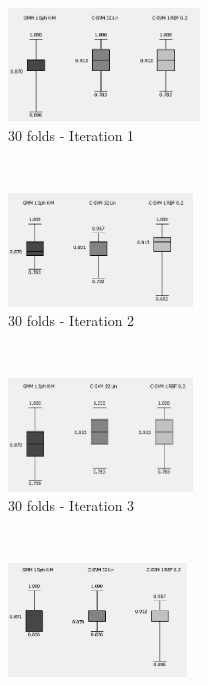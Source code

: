 \documentclass[a4paper,10pt]{article}
\begin{document}
\begin{figure}[H]
\centering
    \begin{subfigure}[t]{0.3\textwidth}
      \centering
      \includegraphics[height=3cm]{pictures/30-fold-train-test-ratio-66percent-test-data-A}
      \caption{30 folds - Iteration 1}
      \label{fig:30-fold-train-test-ratio-66percent-test-data-A}
     \end{subfigure}
      ~
    \begin{subfigure}[t]{0.3\textwidth}
      \centering
      \includegraphics[height=3cm]{pictures/30-fold-train-test-ratio-66percent-test-data-B}
      \caption{30 folds - Iteration 2}
      \label{fig:30-fold-train-test-ratio-66percent-test-data-B}
     \end{subfigure}
      ~
    \begin{subfigure}[t]{0.3\textwidth}
      \centering
      \includegraphics[height=3cm]{pictures/30-fold-train-test-ratio-66percent-test-data-C}
      \caption{30 folds - Iteration 3}
      \label{fig:30-fold-train-test-ratio-66percent-test-data-C}
     \end{subfigure}
      ~
    \begin{subfigure}[t]{0.3\textwidth}
      \centering
      \includegraphics[height=3cm]{pictures/10-fold-train-test-ratio-66percent-test-data-A}

\end{subfigure}
\end{figure}
\end{document}
